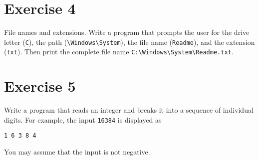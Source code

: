 \documentclass[10pt,a4paper]{article}
\begin{document}
	\section*{Exercise 4}
	File names and extensions. Write a program that prompts the user for the drive letter (\verb|C|), the path (\verb|\Windows\System|), the file name (\verb|Readme|), and the extension (\verb|txt|). Then	print the complete file name \verb|C:\Windows\System\Readme.txt|.
	
	\section*{Exercise 5}
	Write a program that reads an integer and breaks it into a sequence of individual
	digits. For example, the input \verb|16384| is displayed as
	
	\verb|1 6 3 8 4|

	You may assume that the input is not negative.
\end{document}
